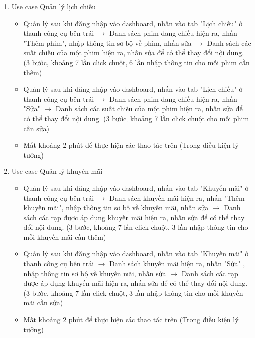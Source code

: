 \documentclass[a4paper, 12pt]{article}
\begin{document}
\begin{enumerate}
        \item Use case Quản lý lịch chiếu 
        \begin{itemize}
            \item Quản lý sau khi đăng nhập vào dashboard, nhấn vào tab "Lịch chiếu" ở thanh công cụ bên trái $\rightarrow$ Danh sách phim đang chiếu hiện ra, nhấn "Thêm phim", nhập thông tin sơ bộ về phim, nhấn sửa $\rightarrow$ Danh sách các suất chiếu của một phim hiện ra, nhấn sửa để có thể thay đổi nội dung. (3 bước, khoảng 7 lần click chuột, 6 lần nhập thông tin cho mỗi phim cần thêm)
            \item Quản lý sau khi đăng nhập vào dashboard, nhấn vào tab "Lịch chiếu" ở thanh công cụ bên trái $\rightarrow$ Danh sách phim đang chiếu hiện ra, nhấn "Sửa" $\rightarrow$ Danh sách các suất chiếu của một phim hiện ra, nhấn sửa để có thể thay đổi nội dung. (3 bước, khoảng 7 lần click chuột cho mỗi phim cần sửa)
            \item Mất khoảng 2 phút để thực hiện các thao tác trên (Trong điều kiện lý tưởng)
        \end{itemize}

        \item Use case Quản lý khuyến mãi
        \begin{itemize}
            \item Quản lý sau khi đăng nhập vào dashboard, nhấn vào tab "Khuyến mãi" ở thanh công cụ bên trái $\rightarrow$ Danh sách khuyến mãi hiện ra, nhấn "Thêm khuyến mãi", nhập thông tin sơ bộ về khuyến mãi, nhấn sửa $\rightarrow$ Danh sách các rạp được áp dụng khuyến mãi hiện ra, nhấn sửa để có thể thay đổi nội dung. (3 bước, khoảng 7 lần click chuột, 3 lần nhập thông tin cho mỗi khuyến mãi cần thêm)
            \item Quản lý sau khi đăng nhập vào dashboard, nhấn vào tab "Khuyến mãi" ở thanh công cụ bên trái $\rightarrow$ Danh sách khuyến mãi hiện ra, nhấn "Sửa" , nhập thông tin sơ bộ về khuyến mãi, nhấn sửa $\rightarrow$ Danh sách các rạp được áp dụng khuyến mãi hiện ra, nhấn sửa để có thể thay đổi nội dung. (3 bước, khoảng 7 lần click chuột, 3 lần nhập thông tin cho mỗi khuyến mãi cần sửa)
            \item Mất khoảng 2 phút để thực hiện các thao tác trên (Trong điều kiện lý tưởng)
        \end{itemize}


\end{enumerate}
\end{document}
